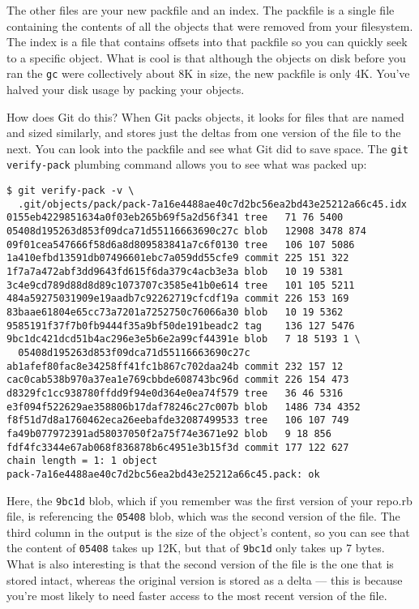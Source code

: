\documentclass[a4paper]{book}
\begin{document}
The other files are your new packfile and an index. The packfile is a single file containing the contents of all the objects that were removed from your filesystem. The index is a file that contains offsets into that packfile so you can quickly seek to a specific object. What is cool is that although the objects on disk before you ran the \texttt{gc} were collectively about 8K in size, the new packfile is only 4K. You've halved your disk usage by packing your objects.

How does Git do this? When Git packs objects, it looks for files that are named and sized similarly, and stores just the deltas from one version of the file to the next. You can look into the packfile and see what Git did to save space. The \texttt{git verify-pack} plumbing command allows you to see what was packed up:

\begin{shaded}\begin{verbatim}
$ git verify-pack -v \
  .git/objects/pack/pack-7a16e4488ae40c7d2bc56ea2bd43e25212a66c45.idx
0155eb4229851634a0f03eb265b69f5a2d56f341 tree   71 76 5400
05408d195263d853f09dca71d55116663690c27c blob   12908 3478 874
09f01cea547666f58d6a8d809583841a7c6f0130 tree   106 107 5086
1a410efbd13591db07496601ebc7a059dd55cfe9 commit 225 151 322
1f7a7a472abf3dd9643fd615f6da379c4acb3e3a blob   10 19 5381
3c4e9cd789d88d8d89c1073707c3585e41b0e614 tree   101 105 5211
484a59275031909e19aadb7c92262719cfcdf19a commit 226 153 169
83baae61804e65cc73a7201a7252750c76066a30 blob   10 19 5362
9585191f37f7b0fb9444f35a9bf50de191beadc2 tag    136 127 5476
9bc1dc421dcd51b4ac296e3e5b6e2a99cf44391e blob   7 18 5193 1 \
  05408d195263d853f09dca71d55116663690c27c
ab1afef80fac8e34258ff41fc1b867c702daa24b commit 232 157 12
cac0cab538b970a37ea1e769cbbde608743bc96d commit 226 154 473
d8329fc1cc938780ffdd9f94e0d364e0ea74f579 tree   36 46 5316
e3f094f522629ae358806b17daf78246c27c007b blob   1486 734 4352
f8f51d7d8a1760462eca26eebafde32087499533 tree   106 107 749
fa49b077972391ad58037050f2a75f74e3671e92 blob   9 18 856
fdf4fc3344e67ab068f836878b6c4951e3b15f3d commit 177 122 627
chain length = 1: 1 object
pack-7a16e4488ae40c7d2bc56ea2bd43e25212a66c45.pack: ok
\end{verbatim}\end{shaded}

Here, the \texttt{9bc1d} blob, which if you remember was the first version of your repo.rb file, is referencing the \texttt{05408} blob, which was the second version of the file. The third column in the output is the size of the object's content, so you can see that the content of \texttt{05408} takes up 12K, but that of \texttt{9bc1d} only takes up 7 bytes. What is also interesting is that the second version of the file is the one that is stored intact, whereas the original version is stored as a delta --- this is because you're most likely to need faster access to the most recent version of the file.
\end{document}
